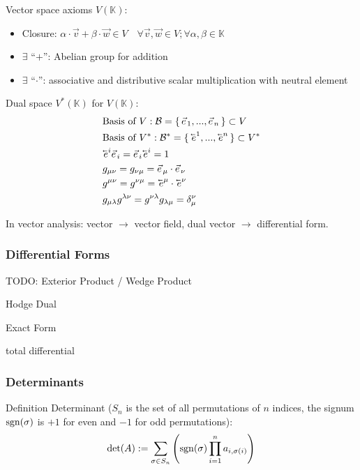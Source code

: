 			\noindent
			Vector space axioms $V(\mathbb{K})$:
			\begin{itemize}
				\item Closure: $\alpha \cdot \vec{v} + \beta \cdot \vec{w} \in V \quad \forall \vec{v}, \vec{w} \in V; \forall \alpha, \beta \in \mathbb{K}$
				\item $\exists$ ``$+$'': Abelian group for addition
				\item $\exists$ ``$\cdot$'': associative and distributive scalar multiplication with neutral element
			\end{itemize}

			\noindent
			Dual space $V^{*}(\mathbb{K})$ for $V(\mathbb{K})$:
			\begin{equation}
				\begin{aligned}
					&\text{Basis of $V$}: \mathcal{B} = \set{ \vec{e}_1,...,\vec{e}_n } \subset V \\
					&\text{Basis of $V^{*}$}: \mathcal{B}^{*} = \set{ \cev{e}^1,...,\cev{e}^n } \subset V^{*} \\
					&\cev{e}^i \vec{e}_i = \vec{e}_i \cev{e}^i = 1 \\
					&g_{\mu\nu} = g_{\nu\mu} = \vec{e}_\mu\cdot\vec{e}_\nu\\
					&g^{\mu\nu} = g^{\nu\mu} = \cev{e}^\mu\cdot\cev{e}^\nu \\
					&g_{\mu\lambda} g^{\lambda\nu} = g^{\nu\lambda}g_{\lambda\mu} = \delta_\mu^\nu \\
				\end{aligned}
			\end{equation}

			In vector analysis: vector $\to$ vector field, dual vector $\to$ differential form.

		\subsubsection{Differential Forms}
			TODO:
			Exterior Product / Wedge Product

			Hodge Dual

			Exact Form

			total differential



		\subsubsection{Determinants}
			Definition Determinant ($S_n$ is the set of all permutations of $n$ indices, the signum $\mathrm{sgn}(\sigma)$ is $+1$ for even and $-1$ for odd permutations):
			\begin{equation}
				\det(A) := \sum_{\sigma\in S_n}\qty(\mathrm{sgn}(\sigma)\prod_{i=1}^{n} a_{i,\sigma(i)})
			\end{equation}

